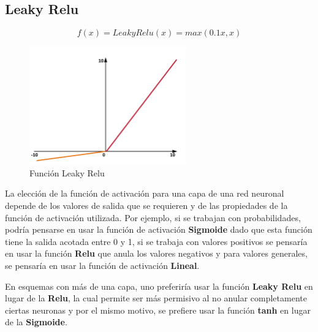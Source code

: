 \subsection{Leaky Relu}

\begin{equation}
    f(x)=LeakyRelu(x)=max(0.1x, x)
\end{equation}
\vspace{1cm}
\hspace{3.5cm}

\newline
\newline
\newline

\begin{figure}[H]
    \centering
    \includegraphics[height=2in]{image/relu}
    \caption{Función Leaky Relu}
    \label{fig:my_label}
\end{figure}

La elección de la función de activación para una capa de una red neuronal depende de los valores de salida que se requieren y de las propiedades de la función de activación utilizada. Por ejemplo, si se trabajan con probabilidades, podría pensarse en usar la función de activación \textbf{Sigmoide} dado que esta función tiene la salida acotada entre 0 y 1, si se trabaja con valores positivos se pensaría en usar la función \textbf{Relu} que anula los valores negativos y para valores generales, se pensaría en usar la función de activación \textbf{Lineal}.

En esquemas con más de una capa, uno preferiría usar la función \textbf{Leaky Relu} en lugar de la \textbf{Relu}, la cual permite ser más permisivo al no anular completamente ciertas neuronas y por el mismo motivo, se prefiere usar la función \textbf{tanh} en lugar de la \textbf{Sigmoide}.


